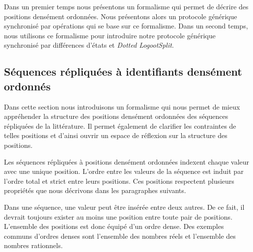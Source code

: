 Dans un premier temps nous présentons un formalisme qui permet de décrire des positions densément ordonnées.
Nous présentons alors un protocole générique synchronisé par opérations qui se base sur ce formalisme.
Dans un second temps, nous utilisons ce formalisme pour introduire notre protocole générique synchronisé par différences d'états et \emph{Dotted LogootSplit}.

%


\subsection{Séquences répliquées à identifiants densément ordonnés}\label{subsec:dense-id-seq}

Dans cette section nous introduisons un formalisme qui nous permet de mieux appréhender la structure des positions densément ordonnées des séquences répliquées de la littérature.
Il permet également de clarifier les contraintes de telles positions et d'ainsi ouvrir un espace de réflexion sur la structure des positions.

Les séquences répliquées à positions densément ordonnées indexent chaque valeur avec une unique position.
L'ordre entre les valeurs de la séquence est induit par l'ordre total et strict entre leurs positions.
Ces positions respectent plusieurs propriétés que nous décrivons dans les paragraphes suivants.

Dans une séquence, une valeur peut être insérée entre deux autres.
De ce fait, il devrait toujours exister au moins une position entre toute pair de positions.
L'ensemble des positions est donc équipé d'un ordre dense.
Des exemples communs d'ordres denses sont l'ensemble des nombres réels et l'ensemble des nombres rationnels.

